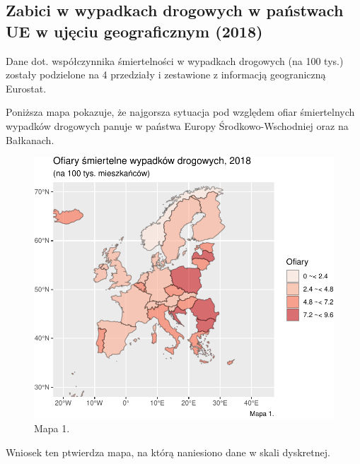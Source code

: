 \documentclass[
]{article}
\begin{document}
\hypertarget{zabici-w-wypadkach-drogowych-w-paux144stwach-ue-w-ujux119ciu-geograficznym-2018}{%
\subsection{Zabici w wypadkach drogowych w państwach UE w ujęciu
geograficznym
(2018)}\label{zabici-w-wypadkach-drogowych-w-paux144stwach-ue-w-ujux119ciu-geograficznym-2018}}

Dane dot. współczynnika śmiertelności w wypadkach drogowych (na 100
tys.) zostały podzielone na 4 przedziały i zestawione z informacją
geograniczną Eurostat.

Poniższa mapa pokazuje, że najgorsza sytuacja pod względem ofiar
śmiertelnych wypadków drogowych panuje w państwa Europy
Środkowo-Wschodniej oraz na Bałkanach.

\begin{figure}

\includegraphics{raport_wypadki_files/figure-latex/unnamed-chunk-5-1} \hfill{}

\caption{Mapa 1.}\label{fig:unnamed-chunk-5}
\end{figure}

Wniosek ten ptwierdza mapa, na którą naniesiono dane w skali dyskretnej.
\end{document}
